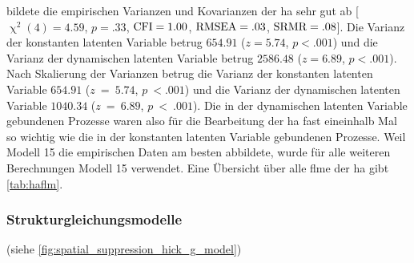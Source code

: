 \documentclass[11pt, twoside, a4paper]{book}		%
\begin{document}
bildete die empirischen Varianzen und Kovarianzen der \gls{ha} sehr gut ab [$\upchi^2(4)=4.59$, $p=.33$, $\textnormal{CFI}=1.00$, $\textnormal{RMSEA}=.03$, $\textnormal{SRMR}=.08$].
Die Varianz der konstanten latenten Variable betrug $654.91$ ($z=5.74$, $p<.001$) und die Varianz der dynamischen latenten Variable betrug $2586.48$ ($z=6.89$, $p<.001$). 
Nach Skalierung der Varianzen \citep{Schweizer2011a} betrug die Varianz der konstanten latenten Variable $654.91$ ($z~=~5.74$, $p~<.001$) und die Varianz der dynamischen latenten Variable $1040.34$ ($z~=~6.89$, $p~<~.001$). Die in der dynamischen latenten Variable gebundenen Prozesse waren also für die Bearbeitung der \gls{ha} fast eineinhalb Mal so wichtig wie die in der konstanten latenten Variable gebundenen Prozesse. Weil Modell 15 die empirischen Daten am besten abbildete, wurde für alle weiteren Berechnungen Modell 15 verwendet. Eine Übersicht über alle \gls{flm}e der \gls{ha} gibt \autoref{tab:haflm}.





\subsubsection*{Strukturgleichungsmodelle}




(siehe \autoref{fig:spatial_suppression_hick_g_model})
\end{document}
